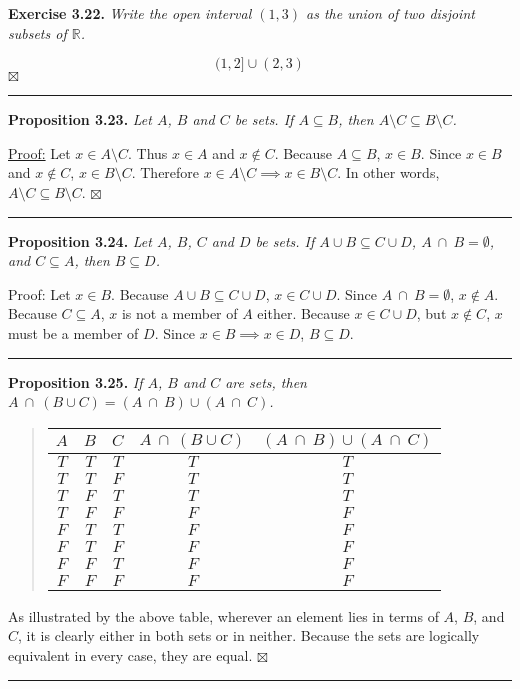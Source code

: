 \documentclass[a4paper,12pt]{article}
\newcommand{\entry}[3]
{
   \noindent\textbf{#1.}
   \emph{#2}
   \bigskip

   \noindent#3
   \bigskip
   \hrule
   \vspace{24pt}
}
\newcommand{\reals}{\mathbb{R}}
\newcommand{\sig}{$\boxtimes$}
\begin{document}
\entry{Exercise 3.22}
{
Write the open interval $(1, 3)$ as the union of two disjoint subsets of $\reals$.
}
{
\[ (1, 2] \cup (2, 3) \]
\sig
}



\entry{Proposition 3.23}
{
Let $A$, $B$ and $C$ be sets. If $A \subseteq B$, then $A \setminus C \subseteq B \setminus C$.
}
{
\underline{Proof:} Let $x \in A \setminus C$. Thus $x \in A$ and $x \not\in C$. Because $A \subseteq B$, $x \in B$. Since $x \in B$ and $x \not\in C$, $x \in B \setminus C$. Therefore $x \in A \setminus C \implies x \in B \setminus C$. In other words,  $A \setminus C \subseteq B \setminus C$. \sig
}



\entry{Proposition 3.24}
{
Let  $A$, $B$, $C$ and $D$ be sets. If $A \cup B \subseteq C \cup D$, $A~\cap~B = \emptyset$, and $C \subseteq A$, then $B \subseteq D$.
}
{
Proof: Let $x \in B$. Because  $A \cup B \subseteq C \cup D$, $x \in C \cup D$. Since $A~\cap~B = \emptyset$, $x \not\in A$. Because $C \subseteq A$, $x$ is not a member of $A$ either. Because $x \in  C \cup D$, but $x \not\in C$, $x$ must be a member of $D$. Since $x \in B \implies x \in D$, $B \subseteq D$.
}



\entry{Proposition 3.25}
{
If $A$, $B$ and $C$ are sets, then $A~\cap~(B \cup C) = (A~\cap~B) \cup (A~\cap~C)$.
}
{
\begin{quote}
\begin{tabular}{|c|c|c|c|c|}
\hline
$A$ & $B$ & $C$ & $A~\cap~(B \cup C)$ & $(A~\cap~B) \cup (A~\cap~C)$ \\
\hline
$T$ & $T$ & $T$ & $T$ & $T$ \\
\hline
$T$ & $T$ & $F$ & $T$ & $T$ \\
\hline
$T$ & $F$ & $T$ & $T$ & $T$ \\
\hline
$T$ & $F$ & $F$ & $F$ & $F$ \\
\hline
$F$ & $T$ & $T$ & $F$ & $F$ \\
\hline
$F$ & $T$ & $F$ & $F$ & $F$ \\
\hline
$F$ & $F$ & $T$ & $F$ & $F$ \\
\hline
$F$ & $F$ & $F$ & $F$ & $F$ \\
\hline
\end{tabular}
\end{quote}
As illustrated by the above table, wherever an element lies in terms of $A$, $B$, and $C$, it is clearly either in both sets or in neither. Because the sets are logically equivalent in every case, they are equal. \sig
}
\end{document}
